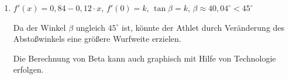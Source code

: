 \begin{langesbeispiel}
{\begin{enumerate}
	Die Wurfweite der Kugel war 10,74\,m.
	
	Die Wurfweite wird bestimmt durch die rechte Nullstelle der Parabel:
	
	$0=\tan\beta\cdot x-\dfrac{g}{2v_0^2\cdot \cos²\beta}\cdot x²$
	
	$0=x\cdot\left(\tan\beta-\dfrac{g}{2v_0^2\cdot \cos²\beta}\cdot x\right)$
	
	$x=\dfrac{\tan\beta\cdot 2v_0^2\cdot\cos^2\beta}{g}$
			
			Bei größerem $g$ wird die Wurfweite kleiner. Es liegt eine indirekte Proportionalität vor.
			
			\item $f'(x)=0,84-0,12\cdot x$, $f'(0)=k$, $\tan\beta=k$, $\beta\approx 40,04^\circ<45^\circ$
			
			Da der Winkel $\beta$ ungleich $45^\circ$ ist, könnte der Athlet durch Veränderung des Abstoßwinkels eine größere Wurfweite erzielen.
			
			Die Berechnung von Beta kann auch graphisch mit Hilfe von Technologie erfolgen.
			\end{enumerate}}
		\end{langesbeispiel}